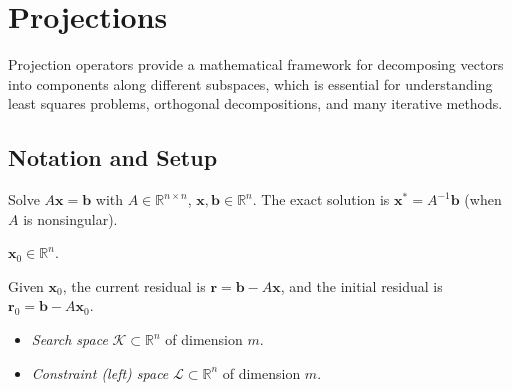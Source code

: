 \chapter{Projections}
\label{chap:projections}

Projection operators provide a mathematical framework for decomposing vectors into components along different subspaces, which is essential for understanding least squares problems, orthogonal decompositions, and many iterative methods.

\section{Notation and Setup}
\begin{description}[style=nextline, labelwidth=5cm, leftmargin=5.5cm, font=\normalfont\bfseries]
    \item[Linear system.] Solve \(A\mathbf{x}=\mathbf{b}\) with \(A \in \mathbb{R}^{n\times n}\), \(\mathbf{x},\mathbf{b} \in \mathbb{R}^n\). The exact solution is \(\mathbf{x}^{\ast}  = A^{-1}\mathbf{b}\) (when \(A\) is nonsingular).
    \item[Initial guess.] \(\mathbf{x}_0 \in \mathbb{R}^n\).
    \item[Residuals.] Given \(\mathbf{x}_0\), the current residual is \(\mathbf{r} = \mathbf{b} - A \mathbf{x}\), and the initial residual is \(\mathbf{r}_0 = \mathbf{b} - A \mathbf{x}_0\).
    \item[Subspaces.]
          \begin{itemize}
              \item \emph{Search space} \(\mathcal{K}\subset\mathbb{R}^n\) of dimension \(m\).
              \item \emph{Constraint (left) space} \(\mathcal{L}\subset\mathbb{R}^n\) of dimension \(m\).
          \end{itemize}


\end{description}

